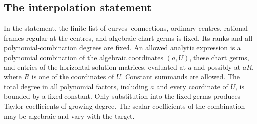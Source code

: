 \subsection{The interpolation statement}

In the statement, the finite list of curves, connections, ordinary
centres, rational frames regular at the centres, and algebraic chart
germs is fixed.  Its ranks and all polynomial-combination degrees are
fixed.  An allowed analytic expression is a polynomial combination of
the algebraic coordinates $(a,U)$, these chart germs, and entries of the
horizontal solution matrices, evaluated at $a$ and possibly at $aR$,
where $R$ is one of the coordinates of $U$.  Constant summands are
allowed.  The total degree in all polynomial factors, including $a$
and every coordinate of $U$, is bounded by a fixed constant.  Only
substitution into the fixed germs produces Taylor coefficients of
growing degree.  The scalar coefficients of the combination may be
algebraic and vary with the target.

